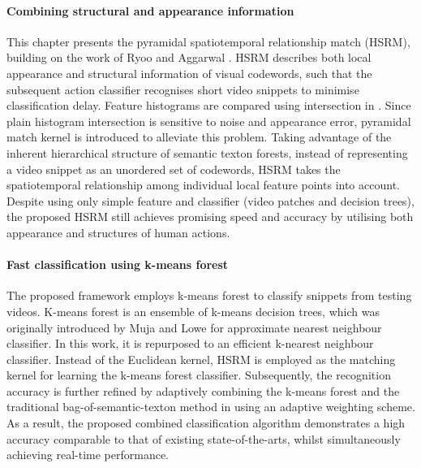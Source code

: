 \paragraph{Combining structural and appearance information}
This chapter presents the pyramidal spatiotemporal relationship match (HSRM), building on the work of Ryoo and Aggarwal \cite{Ryoo2009}.  
HSRM describes both local appearance and structural information of visual codewords, such that the subsequent action classifier recognises short video snippets to minimise classification delay. 
Feature histograms are compared using intersection in \cite{Ryoo2009}. 
Since plain histogram intersection is sensitive to noise and appearance error, pyramidal match kernel \cite{Grauman2005} is introduced to alleviate this problem. 
Taking advantage of the inherent hierarchical structure of semantic texton forests, instead of representing a video snippet as an unordered set of codewords, HSRM takes the spatiotemporal relationship among individual local feature points into account. 
Despite using only simple feature and classifier (video patches and decision trees), the proposed HSRM still achieves promising speed and accuracy by utilising both appearance and structures of human actions. 


\paragraph{Fast classification using k-means forest} 
The proposed framework employs k-means forest to classify snippets from testing videos. 
K-means forest is an ensemble of k-means decision trees, which was originally introduced by Muja and Lowe \cite{Muja2009} for approximate nearest neighbour classifier. In this work, it is repurposed to an efficient k-nearest neighbour classifier. Instead of the Euclidean kernel, HSRM is employed as the matching kernel for learning the k-means forest classifier.  
Subsequently, the recognition accuracy is further refined by adaptively combining the k-means forest and the traditional bag-of-semantic-texton method in \cite{Shotton2008} using an adaptive weighting scheme. 
As a result, the proposed combined classification algorithm demonstrates a high accuracy comparable to that of existing state-of-the-arts, whilst simultaneously achieving real-time performance. 


